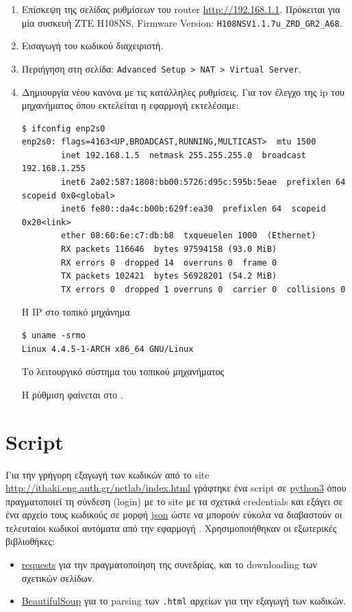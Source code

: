 \begin{enumerate}
\item Επίσκεψη της σελίδας ρυθμίσεων του router \url{http://192.168.1.1}.
Πρόκειται για μία συσκευή ZTE H108NS, Firmware Version: \texttt{H108NSV1.1.7u\_ZRD\_GR2\_A68}.
\item Εισαγωγή του κωδικού διαχειριστή.
\item Περιήγηση στη σελίδα: \texttt{Advanced Setup > NAT > Virtual Server}.
\item Δημιουργία νέου κανόνα με τις κατάλληλες ρυθμίσεις.
Για τον έλεγχο της ip του μηχανήματος όπου εκτελείται η εφαρμογή εκτελέσαμε:
\begin{code}
\begin{verbatim}
$ ifconfig enp2s0
enp2s0: flags=4163<UP,BROADCAST,RUNNING,MULTICAST>  mtu 1500
        inet 192.168.1.5  netmask 255.255.255.0  broadcast 192.168.1.255
        inet6 2a02:587:1808:bb00:5726:d95c:595b:5eae  prefixlen 64  scopeid 0x0<global>
        inet6 fe80::da4c:b00b:629f:ea30  prefixlen 64  scopeid 0x20<link>
        ether 08:60:6e:c7:db:b8  txqueuelen 1000  (Ethernet)
        RX packets 116646  bytes 97594158 (93.0 MiB)
        RX errors 0  dropped 14  overruns 0  frame 0
        TX packets 102421  bytes 56928201 (54.2 MiB)
        TX errors 0  dropped 1 overruns 0  carrier 0  collisions 0
\end{verbatim}
\caption{Η IP στο τοπικό μηχάνημα}
\end{code}
\begin{code}
\begin{verbatim}
$ uname -srmo
Linux 4.4.5-1-ARCH x86_64 GNU/Linux
\end{verbatim}
\caption{Το λειτουργικό σύστημα του τοπικού μηχανήματος}
\end{code}
Η ρύθμιση φαίνεται στο .
\end{enumerate}

\section{Script \scriptname{}}\label{section:script}
Για την γρήγορη εξαγωγή των κωδικών από το site \url{http://ithaki.eng.auth.gr/netlab/index.html} γράφτηκε ένα script σε
\href{https://www.python.org/}{python3}
όπου πραγματοποιεί τη σύνδεση (login) με το site με τα σχετικά credentials και εξάγει σε ένα αρχείο τους κωδικούς σε μορφή
\href{https://en.wikipedia.org/wiki/JSON}{json} ώστε να μπορούν εύκολα να διαβαστούν οι τελευταίοι κωδικοί αυτόματα από την εφαρμογή \appname{}.
Χρησιμοποιήθηκαν οι εξωτερικές βιβλιοθήκες:
\begin{itemize}
\item \href{http://docs.python-requests.org/en/master/}{requests} για την πραγματοποίηση της συνεδρίας, και το downloading των σχετικών σελίδων.
\item \href{http://www.crummy.com/software/BeautifulSoup/}{BeautifulSoup} για το parsing των \texttt{.html} αρχείων για την εξαγωγή των κωδικών.
\end{itemize}

